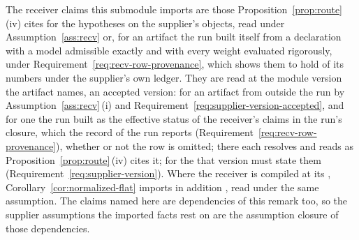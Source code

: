 \begin{remark}
\label{rem:receiver-imports}
The receiver claims this submodule imports are those
Proposition~\ref{prop:route}\,(iv) cites for the hypotheses on the
supplier's objects, read under Assumption~\ref{ass:recv} or, for an
artifact the run built itself from a declaration with a model admissible
exactly and with every weight evaluated rigorously, under
Requirement~\ref{req:recv-row-provenance}, which shows them to hold of its
numbers under the supplier's own ledger. They are read at
the module version the artifact names, an accepted version: for an
artifact from outside the run by Assumption~\ref{ass:recv}\,(i) and
Requirement~\ref{req:supplier-version-accepted}, and for one the run built
as the effective status of the receiver's claims in the run's closure, which
the record of the run reports (Requirement~\ref{req:recv-row-provenance}),
whether or not the row is omitted; there each resolves and
reads as Proposition~\ref{prop:route}\,(iv) cites it; for the
 that version must state them
(Requirement~\ref{req:supplier-version}). Where the receiver is compiled at
its , Corollary~\ref{cor:normalized-flat} imports in
addition ,
read under the same assumption. The claims named here are
dependencies of this remark too, so the supplier assumptions the imported
facts rest on are the assumption closure of those dependencies.


\end{remark}
